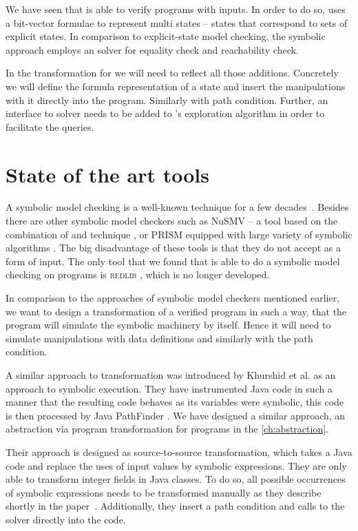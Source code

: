 \begin{summary}
We have seen that \SymDIVINE is able to verify programs with inputs. In order to
do so, \SymDIVINE uses a bit-vector formulae to represent multi states --
states that correspond to sets of explicit states. In comparison to
explicit-state model checking, the symbolic approach employs an \SMT solver for
equality check and reachability check.

In the transformation for \DIVINE we will need to reflect all those additions.
Concretely we will define the formula representation of a state and insert
the manipulations with it directly into the program. Similarly with path
condition. Further, an interface to \SMT solver needs to be added to
\DIVINE's exploration algorithm in order to facilitate the \SMT queries.
\end{summary}

\section{State of the art tools}

A symbolic model checking is a well-known technique for a few
decades~\cite{McMillan93}. Besides \SymDIVINE there are other symbolic
model checkers such as NuSMV -- a tool based on the combination of \SMT and \BDD
technique \cite{Cimatti20}, or PRISM equipped with large variety of symbolic
algorithms \cite{Kwiatkowska20}. The big disadvantage of these tools is that
they do not accept \Cpp{} as a form of input. The only tool that we found that
is able to do a symbolic model checking on \Cpp{} programs is \textsc{redlib}
\cite{redlib}, which is no longer developed.

In comparison to the approaches of symbolic model checkers mentioned earlier, we
want to design a transformation of a verified program in such a way, that the
program will simulate the symbolic machinery by itself. Hence it will need to
simulate manipulations with data definitions and similarly with the path
condition.

A similar approach to transformation was introduced by Khurshid et al.
\cite{Khurshid03} as an approach to symbolic execution. They have instrumented
Java code in such a manner that the resulting code behaves as its variables were
symbolic, this code is then processed by Java PathFinder \cite{Havelund20}. We
have designed a similar approach, an abstraction via program transformation for
\LLVM programs in the \autoref{ch:abstraction}.

Their approach is designed as source-to-source transformation, which takes a
Java code and replace the uses of input values by symbolic expressions. They are
only able to transform integer fields in Java classes. To do so, all possible
occurrences of symbolic expressions needs to be transformed manually as they
describe shortly in the paper~\cite{Khurshid03}. Additionally, they insert a
path condition and calls to the solver directly into the code.

